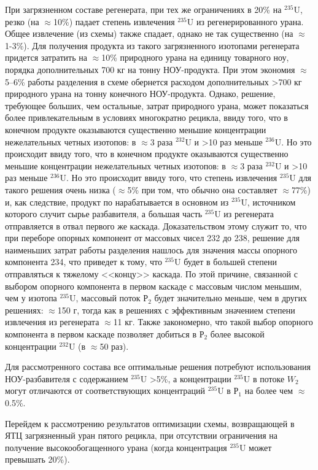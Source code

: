 При загрязненном составе регенерата, при тех же ограничениях в 20\% на $^{235}$U, резко (на $\approx$10\%) падает степень извлечения $^{235}$U из регенерированного урана. Общее извлечение (из схемы) также спадает, однако не так существенно (на $\approx$1-3\%). Для получения продукта из такого загрязненного изотопами регенерата придется затратить на $\approx$10\% природного урана на единицу товарного ноу, порядка дополнительных 700 кг на тонну НОУ-продукта. При этом экономия $\approx$5--6\% работы разделения в схеме обернется расходом дополнительных >700 кг природного урана на тонну конечного НОУ-продукта. Однако, решение, требующее больших, чем остальные, затрат природного урана, может показаться более привлекательным в условиях многократно рецикла, ввиду того, что в конечном продукте оказываются существенно меньшие концентрации нежелательных четных изотопов: в $\approx$3 раза $^{232}$U и >10 раз меньше $^{236}$U. Но это происходит ввиду того, что в конечном продукте оказываются существенно меньшие концентрации нежелательных четных изотопов: в $\approx$3 раза $^{232}$U и >10 раз меньше $^{236}$U. Но это происходит ввиду того, что степень извлечения $^{235}$U для такого решения очень низка ($\approx$5\% при том, что обычно она составляет $\approx$77\%) и, как следствие, продукт по нарабатывается в основном из $^{235}$U, источником которого случит сырье разбавителя, а большая часть $^{235}$U из регенерата отправляется в отвал первого же каскада. Доказательством этому служит то, что при переборе опорных компонент от массовых чисел 232 до 238, решение для наименьших затрат работы разделения нашлось для значения массы опорного компонента 234, что приведет к тому, что $^{235}$U будет в большей степени отправляться к тяжелому <<концу>> каскада. По этой причине, связанной с выбором опорного компонента в первом каскаде с массовым числом меньшим, чем у изотопа $^{235}$U, массовый поток $Р_2$ будет значительно меньше, чем в других решениях: $\approx$150 г, тогда как в решениях с эффективным значением степени извлечения из регенерата $\approx$11 кг. Также закономерно, что такой выбор опорного компонента в первом каскаде позволяет добиться в $Р_2$ более высокой концентрации $^{232}$U (в $\approx$50 раз).

Для рассмотренного состава все оптимальные решения потребуют использования НОУ-разбавителя с содержанием $^{235}$U >5\%, а концентрации $^{235}$U в потоке $W_2$ могут отличаются от соответствующих  концентраций $^{235}$U в $Р_1$ на более чем $\approx$0.5\%.

Перейдем к рассмотрению результатов оптимизации схемы, возвращающей в ЯТЦ загрязненный уран пятого рецикла, при отсутствии ограничения на получение высокообогащенного урана (когда концентрация $^{235}$U может превышать 20\%).


